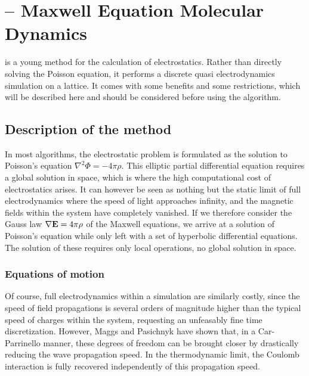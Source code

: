 \chapter{\memd{} -- Maxwell Equation Molecular Dynamics}
\label{cha:memd}

\solvertoindex{\memd{}}

\memd{} is a young method for the calculation of electrostatics. Rather than directly solving the Poisson equation, it performs a discrete quasi electrodynamics simulation on a lattice. It comes with some benefits and some restrictions, which will be described here and should be considered before using the algorithm.

\section{Description of the method}

In most algorithms, the electrostatic problem is formulated as the solution to Poisson's equation $\nabla^2\Phi=-4\pi\rho$. This elliptic partial differential equation requires a global solution in space, which is where the high computational cost of electrostatics arises. It can however be seen as nothing but the static limit of full electrodynamics where the speed of light approaches infinity, and the magnetic fields within the system have completely vanished. If we therefore consider the Gauss law $\nabla \mathbf{E} = 4\pi\rho$ of the Maxwell equations, we arrive at a solution of Poisson's equation while only left with a set of hyperbolic differential equations. The solution of these requires only local operations, no global solution in space.

\subsection{Equations of motion}
\label{sec:memd-equations-of-motion}

Of course, full electrodynamics within a simulation are similarly costly, since the speed of field propagations is several orders of magnitude higher than the typical speed of charges within the system, requesting an unfeasably fine time discretization. However, Maggs and Pasichnyk \cite{maggs02a,pasichnyk04a} have shown that, in a Car-Parrinello manner, these degrees of freedom can be brought closer by drastically reducing the wave propagation speed. In the thermodynamic limit, the Coulomb interaction is fully recovered independently of this propagation speed.

